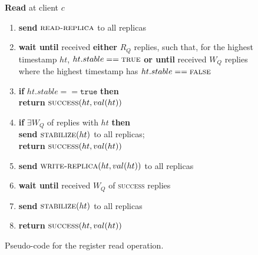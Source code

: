 \begin{figure}[t]
  \begin{small}
    \textbf{Read} at client $c$

    \begin{enumerate}[itemsep=0pt,parsep=0pt]

    \item \textbf{send} $\textsc{read-replica}$ to all replicas

    \item \textbf{wait until} received  \textbf{either} $R_Q$ replies, such that, for the highest timestamp $ht$, $ht.stable==\textsc{true}$
       \textbf{or until} received $W_Q$ replies where the highest timestamp has $ht.stable==\textsc{false}$

    \item \textbf{if} $ht.stable==\texttt{true}$ \textbf{then}\\
        \tabto{.5cm}   \textbf{return} $\textsc{success}(ht,val(ht))$

    \item \textbf{if} $\exists W_Q$ of replies with $ht$ \textbf{then}\\
        \tabto{.5cm} \textbf{send} $\textsc{stabilize}(ht)$ to all replicas;\\
        \tabto{.5cm} \textbf{return} $\textsc{success}(ht,val(ht))$
    \item \textbf{send} $\textsc{write-replica}(ht,val(ht))$ to all replicas
    \item \textbf{wait until} received $W_Q$ of \textsc{success} replies

    \item \textbf{send} $\textsc{stabilize}(ht)$ to all replicas
    \item \textbf{return} $\textsc{success}(ht,val(ht))$

    \end{enumerate}

  \end{small}
  \caption{Pseudo-code for the register read operation.}\label{fig:abd-read}
\end{figure}
